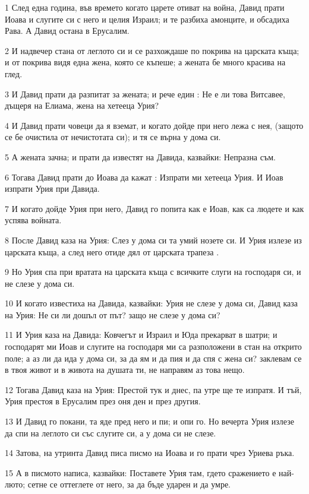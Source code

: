 \par 1 След една година, във времето когато царете отиват на война, Давид прати Иоава и слугите си с него и целия Израил; и те разбиха амонците, и обсадиха Рава. А Давид остана в Ерусалим.
\par 2 И надвечер стана от леглото си и се разхождаше по покрива на царската къща; и от покрива видя една жена, която се къпеше; а жената бе много красива на глед.
\par 3 И Давид прати да разпитат за жената; и рече един : Не е ли това Витсавее, дъщеря на Елиама, жена на хетееца Урия?
\par 4 И Давид прати човеци да я вземат, и когато дойде при него лежа с нея, (защото се бе очистила от нечистотата си); и тя се върна у дома си.
\par 5 А жената зачна; и прати да известят на Давида, казвайки: Непразна съм.
\par 6 Тогава Давид прати до Иоава да кажат : Изпрати ми хетееца Урия. И Иоав изпрати Урия при Давида.
\par 7 И когато дойде Урия при него, Давид го попита как е Иоав, как са людете и как успява войната.
\par 8 После Давид каза на Урия: Слез у дома си та умий нозете си. И Урия излезе из царската къща, а след него отиде дял от царската трапеза .
\par 9 Но Урия спа при вратата на царската къща с всичките слуги на господаря си, и не слезе у дома си.
\par 10 И когато известиха на Давида, казвайки: Урия не слезе у дома си, Давид каза на Урия: Не си ли дошъл от път? защо не слезе у дома си?
\par 11 И Урия каза на Давида: Ковчегът и Израил и Юда прекарват в шатри; и господарят ми Иоав и слугите на господаря ми са разположени в стан на открито поле; а аз ли да ида у дома си, за да ям и да пия и да спя с жена си? заклевам се в твоя живот и в живота на душата ти, не направям аз това нещо.
\par 12 Тогава Давид каза на Урия: Престой тук и днес, па утре ще те изпратя. И тъй, Урия престоя в Ерусалим през оня ден и през другия.
\par 13 И Давид го покани, та яде пред него и пи; и опи го. Но вечерта Урия излезе да спи на леглото си със слугите си, а у дома си не слезе.
\par 14 Затова, на утринта Давид писа писмо на Иоава и го прати чрез Уриева ръка.
\par 15 А в писмото написа, казвайки: Поставете Урия там, гдето сражението е най-люто; сетне се оттеглете от него, за да бъде ударен и да умре.
